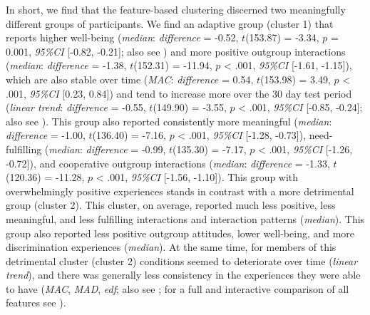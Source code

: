 In short, we find that the feature-based clustering discerned two
meaningfully different groups of participants. We find an adaptive group
(cluster 1) that reports higher well-being (\textit{median}:
\textit{difference} = -0.52, \(t\)(153.87) = -3.34, \(p\) = 0.001,
\textit{95\%CI} {[}-0.82, -0.21{]}; also see
) and more positive outgroup
interactions (\textit{median}: \textit{difference} = -1.38,
\(t\)(152.31) = -11.94, \(p\) \textless{} .001, \textit{95\%CI}
{[}-1.61, -1.15{]}), which are also stable over time (\textit{MAC}:
\textit{difference} = 0.54, \(t\)(153.98) = 3.49, \(p\) \textless{}
.001, \textit{95\%CI} {[}0.23, 0.84{]}) and tend to increase more over
the 30 day test period (\textit{linear trend}: \textit{difference} =
-0.55, \(t\)(149.90) = -3.55, \(p\) \textless{} .001, \textit{95\%CI}
{[}-0.85, -0.24{]}; also see
). This group also reported
consistently more meaningful (\textit{median}: \textit{difference} =
-1.00, \(t\)(136.40) = -7.16, \(p\) \textless{} .001, \textit{95\%CI}
{[}-1.28, -0.73{]}), need-fulfilling (\textit{median}:
\textit{difference} = -0.99, \(t\)(135.30) = -7.17, \(p\) \textless{}
.001, \textit{95\%CI} {[}-1.26, -0.72{]}), and cooperative outgroup
interactions (\textit{median}: \textit{difference} = -1.33,
\(t\)(120.36) = -11.28, \(p\) \textless{} .001, \textit{95\%CI}
{[}-1.56, -1.10{]}). This group with overwhelmingly positive experiences
stands in contrast with a more detrimental group (cluster 2). This
cluster, on average, reported much less positive, less meaningful, and
less fulfilling interactions and interaction patterns (\textit{median}).
This group also reported less positive outgroup attitudes, lower
well-being, and more discrimination experiences (\textit{median}). At
the same time, for members of this detrimental cluster (cluster 2)
conditions seemed to deteriorate over time (\textit{linear trend}), and
there was generally less consistency in the experiences they were able
to have (\textit{MAC}, \textit{MAD}, \textit{edf}; also see
; for a full and interactive
comparison of all features see \situtorial).


